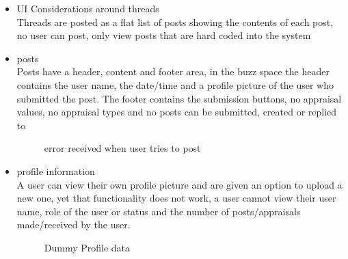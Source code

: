 \begin {itemize}
\item 	UI Considerations around threads\\
Threads are posted as a flat list of posts showing the contents of each post, no user can post, only view posts that are hard coded into the system\\

\item	posts\\
Posts have a header, content and footer area, in the buzz space the header contains the user name, the date/time and a profile picture of the user who submitted the post.  The footer contains the submission buttons, no appraisal values, no appraisal types and no posts can be submitted, created or replied to 

\begin{figure}[h!]
  \centering
  \caption{error received when user tries to post }
\end{figure}

 

\item {profile information}\\
A user can view their own profile picture and are given an option to upload a new one, yet that functionality does not work, a user cannot view their user name, role of the user or status and the number of posts/appraisals made/received by the user.
\\

 \begin{figure}[h!]
  \centering
  \caption{Dummy Profile data }
\end{figure}   


  
\end {itemize}